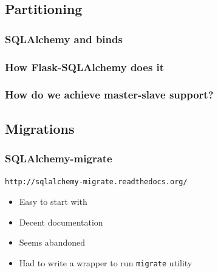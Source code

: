 \documentclass[14pt]{beamer}
\begin{document}
\subsection{Partitioning}

\begin{frame}
  \frametitle{SQLAlchemy and binds}
\end{frame}

\begin{frame}
  \frametitle{How Flask-SQLAlchemy does it}
  
\end{frame}

\begin{frame}
  \frametitle{How do we achieve master-slave support?}
\end{frame}

\subsection{Migrations}

\begin{frame}
  \frametitle{SQLAlchemy-migrate}
    \texttt{http://sqlalchemy-migrate.readthedocs.org/}
  \begin{itemize}
  \item Easy to start with
  \item Decent documentation
  \item Seems abandoned
  \item Had to write a wrapper to run \texttt{migrate} utility
  \end{itemize}
\end{frame}
\end{document}
